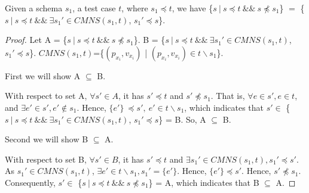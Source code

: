 \begin{proposition}\label{pro:superofCMNS}
Given a schema $s_{1}$, a test case $t$, where $s_{1} \preceq t$, we have \{$s\ |\ s \preceq t\ \&\&\ s \npreceq s_{1}$\} $=$  \{$ s\ |\ s \preceq t \  \&\& \ \exists s_{1}' \in CMNS(s_{1}, t)$, $s_{1}' \preceq s$\}.
\end{proposition}

\begin{proof}
Let A = \{$s\ |\ s \preceq t\ \&\&\ s \npreceq s_{1}$\}. B = \{$ s\ |\ s \preceq t \ \&\&\  \exists s_{1}' \in CMNS(s_{1}, t)$, $s_{1}' \preceq s$\}. $CMNS(s_{1},t)$=\{$(p_{x_{i}}, v_{x_{i}})$ | $(p_{x_{i}}, v_{x_{i}}) \in t \backslash s_{1} $\}.

First we will show A $\subseteq$ B.

With respect to set A, $\forall s' \in A$, it has $s' \preceq t$ and $s' \npreceq s_{1}$. That is, $\forall e \in s', e \in t$, and  $\exists e' \in s', e' \not\in s_{1}$. Hence, $\{e'\}\ \preceq s',\  e' \in t \backslash s_{1}$, which indicates that $s' \in $ \{$ s\ |\ s \preceq t \ \&\&\  \exists s_{1}' \in CMNS(s_{1}, t)$, $s_{1}' \preceq s$\} = B. So, A $\subseteq$ B.


Second we will show B $\subseteq$ A.

With respect to set B, $\forall s' \in B$, it has $s' \preceq t$  and $\exists s_{1}' \in CMNS(s_{1}, t), s_{1}' \preceq s'$. As $s_{1}' \in CMNS(s_{1}, t)$, $\exists e' \in  t \backslash s_{1}, s_{1}' = \{ e' \}$. Hence, $\{e'\} \preceq s'$. Hence, $s' \npreceq s_{1}$. Consequently, $s' \in $  \{$s\ |\ s \preceq t\ \&\&\ s \npreceq s_{1}$\} = A, which indicates that B $\subseteq$ A.

\end{proof}



